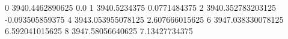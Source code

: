 0 3940.4462890625 0.0
1 3940.5234375 0.0771484375
2 3940.352783203125 -0.093505859375
4 3943.053955078125 2.607666015625
6 3947.038330078125 6.592041015625
8 3947.58056640625 7.13427734375
